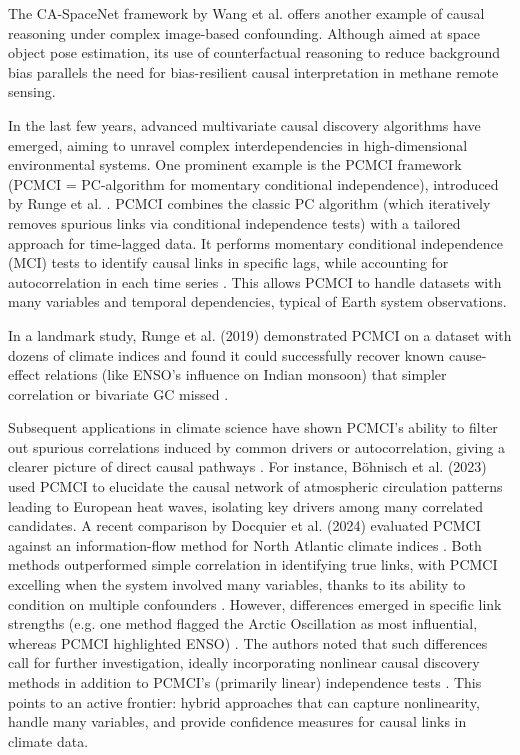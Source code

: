The CA-SpaceNet framework by Wang et al. \cite{wang_ca-spacenet_2022} offers another example of causal reasoning under complex image-based confounding. Although aimed at space object pose estimation, its use of counterfactual reasoning to reduce background bias parallels the need for bias-resilient causal interpretation in methane remote sensing. 

In the last few years, advanced multivariate causal discovery algorithms have emerged, aiming to unravel complex interdependencies in high-dimensional environmental systems. One prominent example is the PCMCI framework (PCMCI = PC-algorithm for momentary conditional independence), introduced by Runge et al. \cite{Runge2020EGU}. PCMCI combines the classic PC algorithm (which iteratively removes spurious links via conditional independence tests) with a tailored approach for time-lagged data. It performs momentary conditional independence (MCI) tests to identify causal links in specific lags, while accounting for autocorrelation in each time series \cite{Runge2019_2}. This allows PCMCI to handle datasets with many variables and temporal dependencies, typical of Earth system observations. 

In a landmark study, Runge et al. (2019) \cite{Runge2019} demonstrated PCMCI on a dataset with dozens of climate indices and found it could successfully recover known cause-effect relations (like ENSO's influence on Indian monsoon) that simpler correlation or bivariate GC missed \cite{Runge2019, Docquier2024}. 

Subsequent applications in climate science have shown PCMCI's ability to filter out spurious correlations induced by common drivers or autocorrelation, giving a clearer picture of direct causal pathways \cite{Docquier2024}. For instance, Böhnisch et al. (2023) \cite{bohnisch_european_2023} used PCMCI to elucidate the causal network of atmospheric circulation patterns leading to European heat waves, isolating key drivers among many correlated candidates. A recent comparison by Docquier et al. (2024) \cite{Docquier2024} evaluated PCMCI against an information-flow method for North Atlantic climate indices \cite{Docquier2024}. Both methods outperformed simple correlation in identifying true links, with PCMCI excelling when the system involved many variables, thanks to its ability to condition on multiple confounders \cite{Docquier2024}. However, differences emerged in specific link strengths (e.g. one method flagged the Arctic Oscillation as most influential, whereas PCMCI highlighted ENSO) \cite{Docquier2024}. The authors noted that such differences call for further investigation, ideally incorporating nonlinear causal discovery methods in addition to PCMCI's (primarily linear) independence tests \cite{Docquier2024}. This points to an active frontier: hybrid approaches that can capture nonlinearity, handle many variables, and provide confidence measures for causal links in climate data. 

